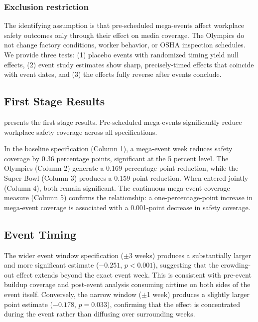 \documentclass[12pt]{article}
\begin{document}
\subsubsection*{Exclusion restriction} The identifying assumption is that pre-scheduled mega-events affect workplace safety outcomes only through their effect on media coverage. The Olympics do not change factory conditions, worker behavior, or OSHA inspection schedules. We provide three tests: (1) placebo events with randomized timing yield null effects, (2) event study estimates show sharp, precisely-timed effects that coincide with event dates, and (3) the effects fully reverse after events conclude.

\subsection{First Stage Results}

 presents the first stage results. Pre-scheduled mega-events significantly reduce workplace safety coverage across all specifications.



In the baseline specification (Column 1), a mega-event week reduces safety coverage by 0.36 percentage points, significant at the 5 percent level. The Olympics (Column 2) generate a 0.169-percentage-point reduction, while the Super Bowl (Column 3) produces a 0.159-point reduction. When entered jointly (Column 4), both remain significant. The continuous mega-event coverage measure (Column 5) confirms the relationship: a one-percentage-point increase in mega-event coverage is associated with a 0.001-point decrease in safety coverage.

\subsection{Event Timing}

The wider event window specification ($\pm$3 weeks) produces a substantially larger and more significant estimate ($-0.251$, $p < 0.001$), suggesting that the crowding-out effect extends beyond the exact event week. This is consistent with pre-event buildup coverage and post-event analysis consuming airtime on both sides of the event itself. Conversely, the narrow window ($\pm$1 week) produces a slightly larger point estimate ($-0.178$, $p = 0.033$), confirming that the effect is concentrated during the event rather than diffusing over surrounding weeks.
\end{document}
